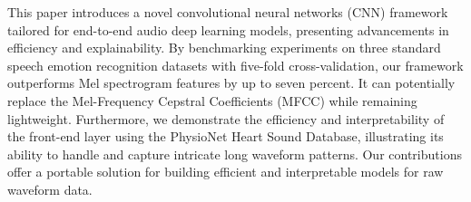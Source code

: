 This paper introduces a novel convolutional neural networks (CNN) framework tailored for end-to-end audio deep learning models, presenting advancements in efficiency and explainability. By benchmarking experiments on three standard speech emotion recognition datasets with five-fold cross-validation, our framework outperforms Mel spectrogram features by up to seven percent. It can potentially replace the Mel-Frequency Cepstral Coefficients (MFCC) while remaining lightweight. Furthermore, we demonstrate the efficiency and interpretability of the front-end layer using the PhysioNet Heart Sound Database, illustrating its ability to handle and capture intricate long waveform patterns. Our contributions offer a portable solution for building efficient and interpretable models for raw waveform data.